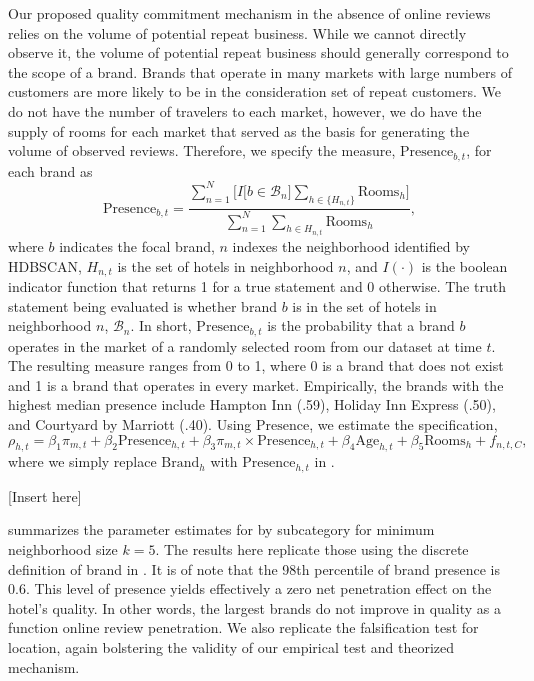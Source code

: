 \documentclass[mksc,blindrev]{informs3} %
\begin{document}
Our proposed quality commitment mechanism in the absence of online reviews relies on the volume of potential repeat business. While we cannot directly observe it, the volume of potential repeat business should generally correspond to the scope of a brand. Brands that operate in many markets with large numbers of customers are more likely to be in the consideration set of repeat customers. We do not have the number of travelers to each market, however, we do have the supply of rooms for each market that served as the basis for generating the volume of observed reviews. Therefore, we specify the measure, $\text{Presence}_{b,t}$, for each brand as
\begin{equation}
\text{Presence}_{b,t}=\frac{\sum_{n=1}^N\bigg[ I\big[b\in \mathcal{B}_n\big]\sum_{h\in \{H_{n,t}\}}\text{Rooms}_{h} \bigg]}{\sum_{n=1}^{N}\sum_{h\in H_{n,t}}\text{Rooms}_h},
\end{equation}
where $b$ indicates the focal brand, $n$ indexes the neighborhood identified by HDBSCAN, $H_{n,t}$ is the set of hotels in neighborhood $n$, and $I(\cdot)$ is the boolean indicator function that returns 1 for a true statement and 0 otherwise. The truth statement being evaluated is whether brand $b$ is in the set of hotels in neighborhood $n$, $\mathcal{B}_n$. In short, $\text{Presence}_{b,t}$ is the probability that a brand $b$ operates in the market of a randomly selected room from our dataset at time $t$. The resulting measure ranges from 0 to 1, where 0 is a brand that does not exist and 1 is a brand that operates in every market. Empirically, the brands with the highest median presence include Hampton Inn (.59), Holiday Inn Express (.50), and Courtyard by Marriott (.40). Using $\text{Presence}$, we estimate the specification,
\begin{equation}\label{eq:nbhd_presence}
\rho_{h,t}=\beta_{1} \pi_{m,t} + \beta_{2} \text{Presence}_{h,t} + \beta_{3} \pi_{m,t}\times \text{Presence}_{h,t} + \beta_{4}\text{Age}_{h,t} + \beta_{5} \text{Rooms}_{h} + f_{n,t,C},
\end{equation}
where we simply replace $\text{Brand}_h$ with $\text{Presence}_{h,t}$ in .  

[Insert  here]

 summarizes the parameter estimates for  by subcategory for minimum neighborhood size $k=5$. The results here replicate those using the discrete definition of brand in . It is of note that the 98th percentile of brand presence is 0.6. This level of presence yields effectively a zero net penetration effect on the hotel's quality. In other words, the largest brands do not improve in quality as a function online review penetration. We also replicate the falsification test for location, again bolstering the validity of our empirical test and theorized mechanism.
\end{document}
